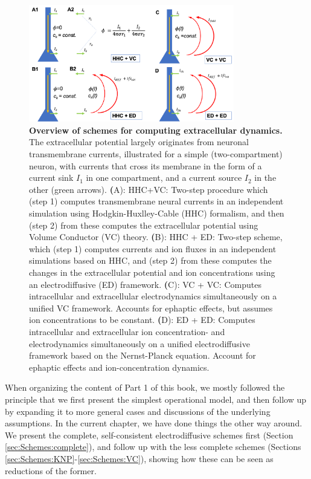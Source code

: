 \begin{figure}[!ht]
\begin{center}
\includegraphics[width=0.8\textwidth]{Figures/Schemes/Schemes.png}
\end{center}
\caption{\textbf{Overview of schemes for computing extracellular dynamics.} The extracellular potential largely originates from neuronal transmembrane currents, illustrated for a simple (two-compartment) neuron, with currents that cross its membrane in the form of a current sink $I_1$ in one compartment, and a current source $I_2$ in the other (green arrows). {\textbf (A)}: HHC+VC: Two-step procedure which (step 1) computes transmembrane neural currents in an independent simulation using Hodgkin-Huxlley-Cable (HHC) formalism, and then (step 2) from these computes the extracellular potential using Volume Conductor (VC) theory. {\textbf (B)}: HHC + ED: Two-step scheme, which (step 1) computes currents and ion fluxes in an independent simulations based on HHC, and (step 2) from these computes the changes in the extracellular potential and ion concentrations using an electrodiffusive (ED) framework. {\textbf (C)}: VC + VC: Computes intracellular and extracellular electrodynamics simultaneously on a unified VC framework. Accounts for ephaptic effects, but assumes ion concentrations to be constant. {\textbf (D)}: ED + ED: Computes intracellular and extracellular ion concentration- and electrodynamics simultaneously on a unified electrodiffusive framework based on the Nernst-Planck equation. Account for ephaptic effects and ion-concentration dynamics. 
}
\label{Schemes:fig:schemes}
\end{figure}

When organizing the content of Part 1 of this book, we mostly followed the principle that we first present the simplest operational model, and then follow up by expanding it to more general cases and discussions of the underlying assumptions. In the current chapter, we have done things the other way around. We present the complete, self-consistent electrodiffusive schemes first (Section \ref{sec:Schemes:complete}), and follow up with the less complete schemes (Sections \ref{sec:Schemes:KNP}-\ref{sec:Schemes:VC}), showing how these can be seen as reductions of the former. 


